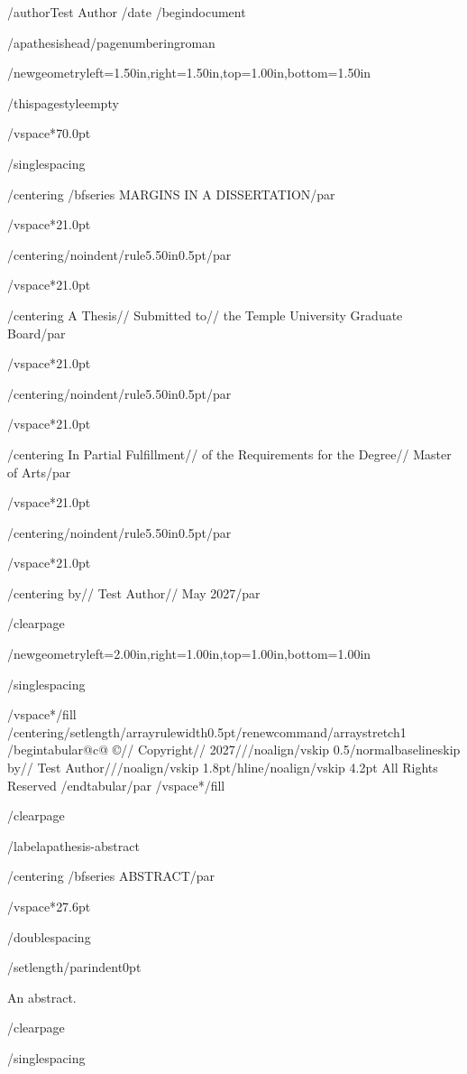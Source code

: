 /author{Test Author}
/date{}
/begin{document}


/apathesishead/pagenumbering{roman}

/newgeometry{left=1.50in,right=1.50in,top=1.00in,bottom=1.50in}

/thispagestyle{empty}

/vspace*{70.0pt}

/singlespacing

{/centering
/bfseries MARGINS IN A DISSERTATION/par}

/vspace*{21.0pt}

{/centering/noindent/rule{5.50in}{0.5pt}/par}

/vspace*{21.0pt}

{/centering
A Thesis//
Submitted to//
the Temple University Graduate Board/par}

/vspace*{21.0pt}

{/centering/noindent/rule{5.50in}{0.5pt}/par}

/vspace*{21.0pt}

{/centering
In Partial Fulfillment//
of the Requirements for the Degree//
Master of Arts/par}

/vspace*{21.0pt}

{/centering/noindent/rule{5.50in}{0.5pt}/par}

/vspace*{21.0pt}

{/centering
by//
Test Author//
May 2027/par}

/clearpage

/newgeometry{left=2.00in,right=1.00in,top=1.00in,bottom=1.00in}

/singlespacing

/vspace*{/fill}
{/centering/setlength{/arrayrulewidth}{0.5pt}/renewcommand{/arraystretch}{1}
/begin{tabular}{@{}c@{}}
©//
Copyright//
2027///noalign{/vskip 0.5/normalbaselineskip}
by//
Test Author///noalign{/vskip 1.8pt}/hline/noalign{/vskip 4.2pt}
All Rights Reserved
/end{tabular}/par}
/vspace*{/fill}

/clearpage

/label{apathesis-abstract}

{/centering
/bfseries ABSTRACT/par}

/vspace*{27.6pt}

/doublespacing

{/setlength{/parindent}{0pt}

An abstract.

}

/clearpage

/singlespacing

